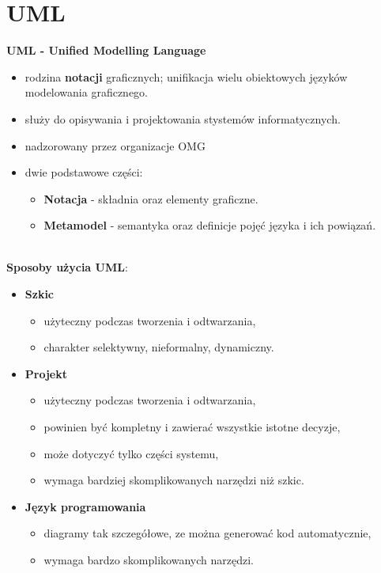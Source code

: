 \documentclass[a4paper]{article}
\begin{document}
    \section {UML}

    \textbf{UML - Unified Modelling Language}
    \begin{itemize}
        \item rodzina \textbf{notacji} graficznych; unifikacja wielu obiektowych języków modelowania graficznego.
        \item służy do opisywania i projektowania stystemów informatycznych.
        \item nadzorowany przez organizacje OMG
        \item dwie podstawowe części:
        \begin{itemize}
            \item \textbf{Notacja} - składnia oraz elementy graficzne.
            \item \textbf{Metamodel} - semantyka oraz definicje pojęć języka i ich powiązań.
        \end{itemize}
    \end{itemize}
    \hfill \\
    \textbf{Sposoby użycia UML}:
    \begin{itemize}
        \item \textbf{Szkic}
        \begin{itemize}
            \item użyteczny podczas tworzenia i odtwarzania,
            \item charakter selektywny, nieformalny, dynamiczny.
        \end{itemize}
        \item \textbf{Projekt}
        \begin{itemize}
            \item użyteczny podczas tworzenia i odtwarzania,
            \item powinien być kompletny i zawierać wszystkie istotne decyzje,
            \item może dotyczyć tylko części systemu,
            \item wymaga bardziej skomplikowanych narzędzi niż szkic.
        \end{itemize}
        \item \textbf{Język programowania}
        \begin{itemize}
            \item diagramy tak szczegółowe, ze można generować kod automatycznie,
            \item wymaga bardzo skomplikowanych narzędzi.
        \end{itemize}
    \end{itemize}
    \hfill \\
\end{document}
